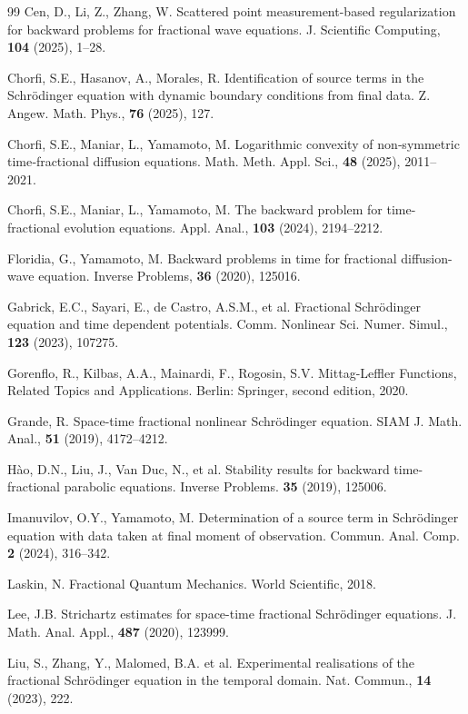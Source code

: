 \documentclass[reqno]{amsart}
\numberwithin{equation}{section}
\begin{document}
\begin{thebibliography}{99}
Cen, D., Li, Z., Zhang, W. Scattered point measurement-based regularization for backward problems for fractional wave equations. J. Scientific Computing, \textbf{104} (2025), 1–28.

Chorfi, S.E., Hasanov, A., Morales, R. Identification of source terms in the Schrödinger equation with dynamic boundary conditions from final data. Z. Angew. Math. Phys., \textbf{76} (2025), 127.

Chorfi, S.E., Maniar, L., Yamamoto, M. Logarithmic convexity of non‐symmetric time‐fractional diffusion equations. Math. Meth. Appl. Sci., \textbf{48} (2025), 2011–2021.

Chorfi, S.E., Maniar, L., Yamamoto, M. The backward problem for time-fractional evolution equations. Appl. Anal., \textbf{103} (2024), 2194–2212.

Floridia, G., Yamamoto, M. Backward problems in time for fractional diffusion-wave equation. Inverse Problems, \textbf{36} (2020), 125016.

Gabrick, E.C., Sayari, E., de Castro, A.S.M., et al. Fractional Schrödinger equation and time dependent potentials. Comm. Nonlinear Sci. Numer. Simul., \textbf{123} (2023), 107275.

Gorenflo, R., Kilbas, A.A., Mainardi, F., Rogosin, S.V. Mittag-Leffler Functions, Related Topics and Applications. Berlin: Springer, second edition, 2020.

Grande, R. Space-time fractional nonlinear Schrödinger equation. SIAM J. Math. Anal., \textbf{51} (2019), 4172–4212.

Hào, D.N., Liu, J., Van Duc, N., et al. Stability results for backward time-fractional parabolic equations. Inverse Problems. \textbf{35} (2019), 125006.

Imanuvilov, O.Y., Yamamoto, M. Determination of a source term in Schrödinger equation with data taken at final
moment of observation. Commun. Anal. Comp. \textbf{2} (2024), 316–342.

Laskin, N. Fractional Quantum Mechanics. World Scientific, 2018.

Lee, J.B. Strichartz estimates for space-time fractional Schrödinger equations. J. Math. Anal. Appl., \textbf{487} (2020), 123999.

Liu, S., Zhang, Y., Malomed, B.A. et al. Experimental realisations of the fractional Schrödinger equation in the temporal domain. Nat. Commun., \textbf{14} (2023), 222.


\end{thebibliography}
\end{document}

